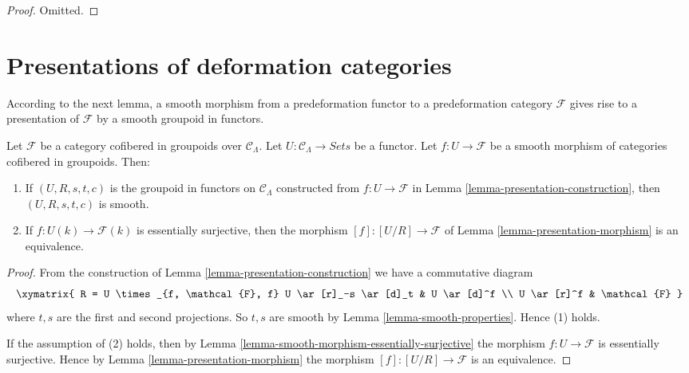 \begin{proof}
Omitted.
\end{proof}







\section{Presentations of deformation categories}
\label{section-presentation-deformation-categories}

\noindent
According to the next lemma, a smooth morphism from a predeformation functor to
a predeformation category $\mathcal{F}$ gives rise to a presentation of
$\mathcal{F}$ by a smooth groupoid in functors.

\begin{lemma}
\label{lemma-smooth-groupoid-in-functors-construction}
Let $\mathcal{F}$ be a category cofibered in groupoids over
$\mathcal{C}_\Lambda$. Let $U : \mathcal{C}_\Lambda \to \textit{Sets}$
be a functor. Let $f : U \to \mathcal{F}$ be a smooth morphism of
categories cofibered in groupoids. Then:
\begin{enumerate}
\item If $(U, R, s, t, c)$ is the groupoid in functors on
$\mathcal{C}_\Lambda$ constructed from $f : U \to \mathcal{F}$ in
Lemma \ref{lemma-presentation-construction}, then $(U, R, s, t, c)$
is smooth.
\item If $f : U(k) \to \mathcal{F}(k)$ is essentially surjective,
then the morphism $[f] : [U/R] \to \mathcal{F}$ of
Lemma \ref{lemma-presentation-morphism}
is an equivalence.
\end{enumerate}
\end{lemma}

\begin{proof}
From the construction of
Lemma \ref{lemma-presentation-construction}
we have a commutative diagram
$$
\xymatrix{
R = U \times_{f, \mathcal{F}, f} U \ar[r]_-s \ar[d]_t & U
\ar[d]^f \\
U \ar[r]^f & \mathcal{F}
}
$$
where $t, s$ are the first and second projections.  So $t, s$ are smooth by
Lemma \ref{lemma-smooth-properties}.  Hence (1) holds.

\medskip\noindent
If the assumption of (2) holds, then by
Lemma \ref{lemma-smooth-morphism-essentially-surjective}
the morphism $f : U \to \mathcal{F}$ is essentially surjective. Hence by
Lemma \ref{lemma-presentation-morphism}
the morphism $[f] : [U/R] \to \mathcal{F}$ is an equivalence.
\end{proof}

